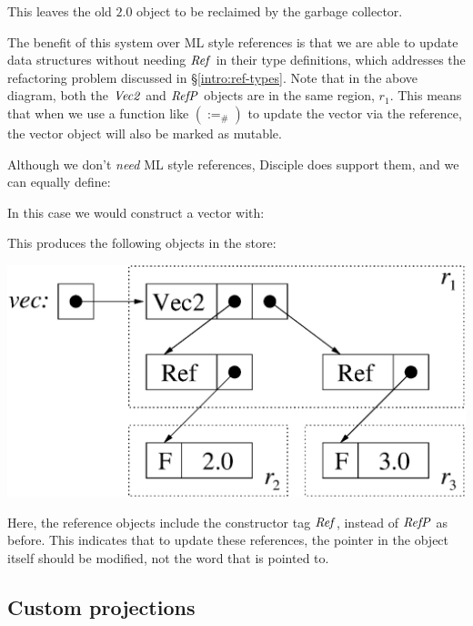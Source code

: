 This leaves the old $2.0$ object to be reclaimed by the garbage collector.

The benefit of this system over ML style references is that we are able to update data structures without needing $\operatorname{\mathit{Ref}}$ in their type definitions, which addresses the refactoring problem discussed in \S\ref{intro:ref-types}. Note that in the above diagram, both the $\operatorname{\mathit{Vec2}}$ and $\operatorname{\mathit{RefP}}$ objects are in the same region, $r_1$. This means that when we use a function like $(:=_{\#})$ to update the vector via the reference, the vector object will also be marked as mutable.

Although we don't \emph{need} ML style references, Disciple does support them, and we can equally define:


In this case we would construct a vector with:


This produces the following objects in the store:

\begin{center}
\includegraphics[scale=0.5]{2-System/fig/projections/vec-ref}
\end{center}

Here, the reference objects include the constructor tag $\operatorname{\mathit{Ref}}$, instead of $\operatorname{\mathit{RefP}}$ as before. This indicates that to update these references, the pointer in the object itself should be modified, not the word that is pointed to.




\subsection{Custom projections}
\label{System:Projections:custom}

